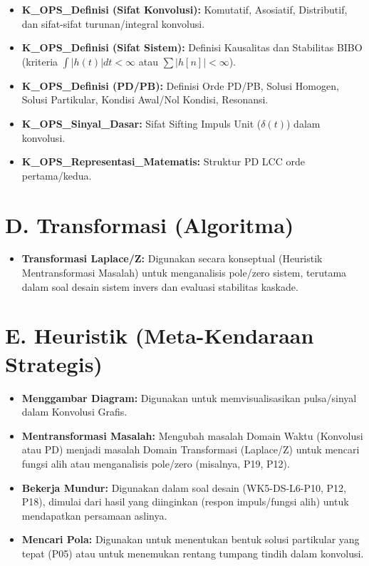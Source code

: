 \documentclass[
  letterpaper,
  DIV=11,
  numbers=noendperiod]{scrreprt}
\providecommand{\tightlist}{%
  \setlength{\itemsep}{0pt}\setlength{\parskip}{0pt}}
\begin{document}
\begin{itemize}
\tightlist
\item
  \textbf{K\_OPS\_Definisi (Sifat Konvolusi):} Komutatif, Asosiatif,
  Distributif, dan sifat-sifat turunan/integral konvolusi.
\item
  \textbf{K\_OPS\_Definisi (Sifat Sistem):} Definisi Kausalitas dan
  Stabilitas BIBO (kriteria \(\int |h(t)| dt < \infty\) atau
  \(\sum |h[n]| < \infty\)).
\item
  \textbf{K\_OPS\_Definisi (PD/PB):} Definisi Orde PD/PB, Solusi
  Homogen, Solusi Partikular, Kondisi Awal/Nol Kondisi, Resonansi.
\item
  \textbf{K\_OPS\_Sinyal\_Dasar:} Sifat Sifting Impuls Unit
  (\(\delta(t)\)) dalam konvolusi.
\item
  \textbf{K\_OPS\_Representasi\_Matematis:} Struktur PD LCC orde
  pertama/kedua.
\end{itemize}

\section{D. Transformasi (Algoritma)}\label{d.-transformasi-algoritma}

\begin{itemize}
\tightlist
\item
  \textbf{Transformasi Laplace/Z:} Digunakan secara konseptual
  (Heuristik Mentransformasi Masalah) untuk menganalisis pole/zero
  sistem, terutama dalam soal desain sistem invers dan evaluasi
  stabilitas kaskade.
\end{itemize}

\section{E. Heuristik (Meta-Kendaraan
Strategis)}\label{e.-heuristik-meta-kendaraan-strategis}

\begin{itemize}
\tightlist
\item
  \textbf{Menggambar Diagram:} Digunakan untuk memvisualisasikan
  pulsa/sinyal dalam Konvolusi Grafis.
\item
  \textbf{Mentransformasi Masalah:} Mengubah masalah Domain Waktu
  (Konvolusi atau PD) menjadi masalah Domain Transformasi (Laplace/Z)
  untuk mencari fungsi alih atau menganalisis pole/zero (misalnya, P19,
  P12).
\item
  \textbf{Bekerja Mundur:} Digunakan dalam soal desain (WK5-DS-L6-P10,
  P12, P18), dimulai dari hasil yang diinginkan (respon impuls/fungsi
  alih) untuk mendapatkan persamaan aslinya.
\item
  \textbf{Mencari Pola:} Digunakan untuk menentukan bentuk solusi
  partikular yang tepat (P05) atau untuk menemukan rentang tumpang
  tindih dalam konvolusi.
\end{itemize}
\end{document}
